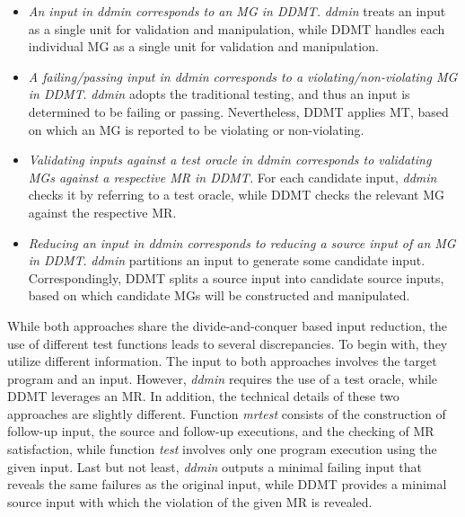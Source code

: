 \begin{itemize}
\item \emph{An input in ddmin corresponds to an MG in {DDMT}.} 
\emph{ddmin} treats an input as a single unit for validation and manipulation, while DDMT handles each individual MG as a single unit for validation and manipulation.

\item \emph{A failing/passing input in ddmin corresponds to a violating/non-violating MG in {DDMT}}. \emph{ddmin} adopts the traditional testing, and thus an input is determined to be failing or passing. Nevertheless, DDMT applies MT, based on which an MG is reported to be violating or non-violating.

\item \emph{Validating inputs against a test oracle in {ddmin} corresponds to validating MGs against a respective MR in {DDMT}.}
For each candidate input, \emph{ddmin} checks it by referring to a test oracle, while DDMT checks the relevant MG against the respective MR.

\item \emph{Reducing an input in {ddmin} corresponds to reducing a source input of an MG in DDMT}.
\emph{ddmin} partitions an input to generate some candidate input.
Correspondingly, DDMT splits a source input into candidate source inputs, based on which candidate MGs will be constructed and manipulated.
\end{itemize}

While both approaches share the divide-and-conquer based input reduction, the use of different test functions leads to several discrepancies.
To begin with, they utilize different information.
The input to both approaches involves the target program and an input.
However, \emph{ddmin} requires the use of a test oracle, while DDMT leverages an MR.
In addition, the technical details of these two approaches are slightly different.
Function \emph{mrtest} consists of the construction of follow-up input,  the source and follow-up executions, and the checking of MR satisfaction, while function \emph{test} involves only one program execution using the given input.
Last but not least, \emph{ddmin} outputs a minimal failing input that reveals the same failures as the original input, while DDMT provides a minimal source input with which the violation of the given MR is revealed.

